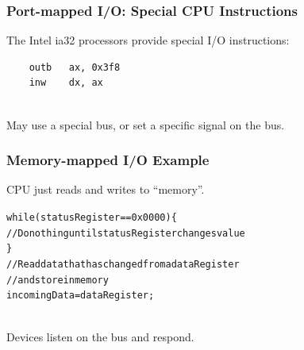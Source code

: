 \begin{frame}[fragile]
\frametitle{Port-mapped I/O: Special CPU Instructions}

\begin{changemargin}{1.5cm}
The Intel ia32 processors provide special I/O instructions:\\[1em]
\begin{verbatim}
    outb   ax, 0x3f8
    inw    dx, ax
\end{verbatim}
~\\
May use a special bus, or set a specific signal on the bus.
\end{changemargin}

\end{frame}


\begin{frame}
\frametitle{Memory-mapped I/O Example}

\begin{changemargin}{1cm}
CPU just reads and writes to ``memory''.\\[1em]
\end{changemargin}

\small
\begin{changemargin}{1em}
\begin{alltt}
 while (\alert{statusRegister} == 0x0000) \{\\
 \qquad // Do nothing until statusRegister changes value\\
 \}\\
 //  Read data that has changed from a dataRegister\\
 //  and store in memory\\
 incomingData = \alert{dataRegister};\\
\end{alltt}
\end{changemargin}

\begin{changemargin}{1cm}
~\\[1em] Devices listen on the bus and respond.
\end{changemargin}


\end{frame}


